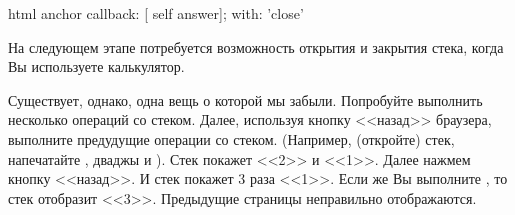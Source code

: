 \documentclass[a4paper,10pt,twoside]{book}
\begin{document}


\begin{code}{}
html anchor
	callback: [ self answer];
	with: 'close'
\end{code}


На следующем этапе потребуется возможность открытия и закрытия стека,
когда Вы используете калькулятор.


Существует, однако, одна вещь о которой мы забыли.
Попробуйте выполнить несколько операций со стеком.
Далее, используя кнопку <<назад>> браузера, выполните
предудущие операции со стеком.
(Например,  (откройте) стек, напечатайте ,
 дваджы
и \menu{+}). Стек покажет <<2>> и <<1>>. Далее нажмем кнопку
<<назад>>. И стек покажет 3 раза <<1>>. Если же Вы выполните \menu{+},
то стек отобразит <<3>>. Предыдущие страницы неправильно
отображаются.


\end{document}

